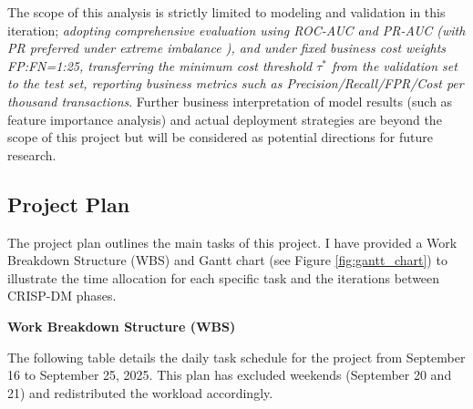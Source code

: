 \documentclass[sigplan,screen]{acmart}
\begin{document}
The scope of this analysis is strictly limited to modeling and validation in this iteration; \textit{adopting comprehensive evaluation using ROC-AUC and PR-AUC (with PR preferred under extreme imbalance \citep{saito2015precision}), and under fixed business cost weights FP:FN=1:25, transferring the minimum cost threshold $\tau^*$ from the validation set to the test set, reporting business metrics such as Precision/Recall/FPR/Cost per thousand transactions}. Further business interpretation of model results (such as feature importance analysis) and actual deployment strategies are beyond the scope of this project but will be considered as potential directions for future research.

\subsection{Project Plan}
    
The project plan outlines the main tasks of this project. I have provided a Work Breakdown Structure (WBS) and Gantt chart (see Figure \ref{fig:gantt_chart}) to illustrate the time allocation for each specific task and the iterations between CRISP-DM phases.
    
\textbf{Work Breakdown Structure (WBS)}
    
The following table details the daily task schedule for the project from September 16 to September 25, 2025. This plan has excluded weekends (September 20 and 21) and redistributed the workload accordingly.
\end{document}
